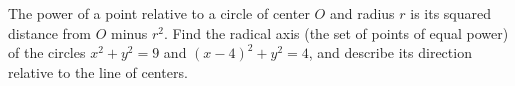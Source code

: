 The power of a point relative to a circle of center $O$ and radius $r$ is its squared distance from $O$ minus $r^2$. Find the radical axis (the set of points of equal power) of the circles $x^2+y^2=9$ and $(x-4)^2+y^2=4$, and describe its direction relative to the line of centers.
